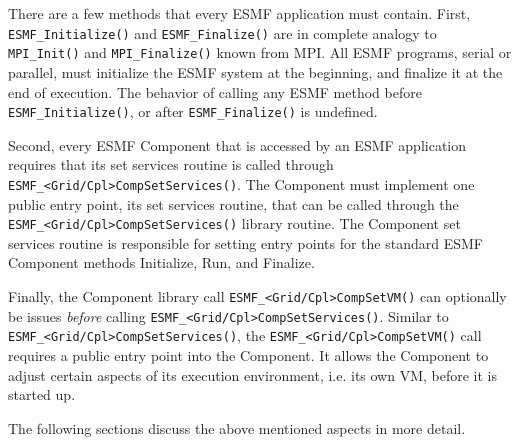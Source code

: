 %

\begin{sloppypar}
There are a few methods that every ESMF application must contain. First,
{\tt ESMF\_Initialize()} and {\tt ESMF\_Finalize()} are in complete analogy 
to {\tt MPI\_Init()} and {\tt MPI\_Finalize()} known from MPI. All ESMF
programs, serial or parallel, must initialize the ESMF system at the beginning,
and finalize it at the end of execution. The behavior of calling any
ESMF method before {\tt ESMF\_Initialize()}, or after {\tt ESMF\_Finalize()}
is undefined.
\end{sloppypar}

Second, every ESMF Component that is accessed by an ESMF application requires
that its set services routine is called through
{\tt ESMF\_<Grid/Cpl>CompSetServices()}. The Component must implement
one public entry point, its set services routine, that can be called
through the {\tt ESMF\_<Grid/Cpl>CompSetServices()} library routine. The
Component set services routine is responsible for setting entry points
for the standard ESMF Component methods Initialize, Run, and Finalize.

\begin{sloppypar}
Finally, the Component library call {\tt ESMF\_<Grid/Cpl>CompSetVM()} can
optionally be issues {\em before} calling
{\tt ESMF\_<Grid/Cpl>CompSetServices()}. Similar to 
{\tt ESMF\_<Grid/Cpl>CompSetServices()}, the 
{\tt ESMF\_<Grid/Cpl>CompSetVM()}
call requires a public entry point into the Component. It allows the Component
to adjust certain aspects of its execution environment, i.e. its own VM, before
it is started up.
\end{sloppypar}

The following sections discuss the above mentioned aspects in more detail.
